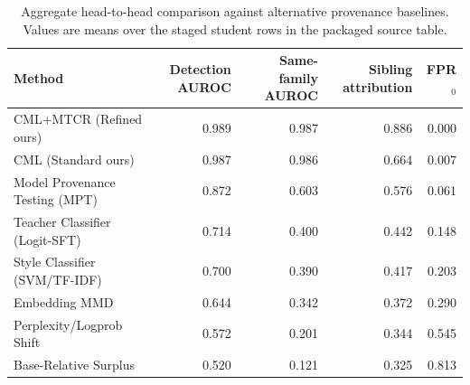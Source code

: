 \begin{table}[!htbp]\centering\footnotesize
\caption{Aggregate head-to-head comparison against alternative provenance baselines. Values are means over the staged student rows in the packaged source table.}
\label{tab:supp_baseline_head_to_head}
\begin{tabular}{lrrrr}
\toprule
Method & Detection AUROC & Same-family AUROC & Sibling attribution & FPR$_0$ \\
\midrule
CML+MTCR (Refined ours) & 0.989 & 0.987 & 0.886 & 0.000 \\
CML (Standard ours) & 0.987 & 0.986 & 0.664 & 0.007 \\
Model Provenance Testing (MPT) & 0.872 & 0.603 & 0.576 & 0.061 \\
Teacher Classifier (Logit-SFT) & 0.714 & 0.400 & 0.442 & 0.148 \\
Style Classifier (SVM/TF-IDF) & 0.700 & 0.390 & 0.417 & 0.203 \\
Embedding MMD & 0.644 & 0.342 & 0.372 & 0.290 \\
Perplexity/Logprob Shift & 0.572 & 0.201 & 0.344 & 0.545 \\
Base-Relative Surplus & 0.520 & 0.121 & 0.325 & 0.813 \\
\bottomrule
\end{tabular}
\end{table}
